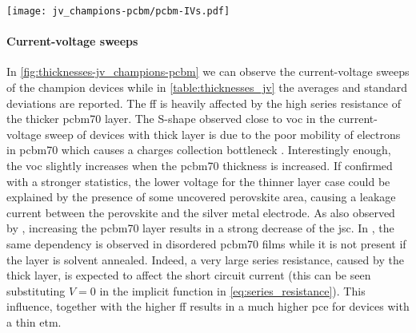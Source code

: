 	\begin{SCfigure}
		\centering
		\texttt{[image: jv\_champions-pcbm/pcbm-IVs.pdf]}
		\label{fig:thicknesses-jv_champions-pcbm}
	\end{SCfigure}

	\paragraph{Current-voltage sweeps}
	In \cref{fig:thicknesses-jv_champions-pcbm} we can observe the current-voltage sweeps of the champion devices while in \cref{table:thicknesses_jv} the averages and standard deviations are reported.
	The \gls{ff} is heavily affected by the high series resistance of the thicker \gls{pcbm70} layer.
	The S-shape observed close to \gls{voc} in the current\hyp{}voltage sweep of devices with thick  layer is due to the poor mobility of electrons in \gls{pcbm70} \cite{VonHauff2005} which causes a charges collection bottleneck \cite{Wheeler2015}.
	Interestingly enough, the \gls{voc} slightly increases when the \gls{pcbm70} thickness is increased.
	If confirmed with a stronger statistics, the lower voltage for the thinner layer case could be explained by the presence of some uncovered perovskite area, causing a leakage current between the perovskite and the silver metal electrode.
	As also observed by , increasing the \gls{pcbm70} layer results in a strong decrease of the \gls{jsc}.
	In , the same dependency is observed in disordered \gls{pcbm70} films while it is not present if the layer is solvent annealed.
	Indeed, a very large series resistance, caused by the thick  layer, is expected to affect the short circuit current (this can be seen substituting $V=0$ in the implicit function in \cref{eq:series_resistance}).
	This influence, together with the higher \gls{ff} results in a much higher \gls{pce} for devices with a thin \gls{etm}.

